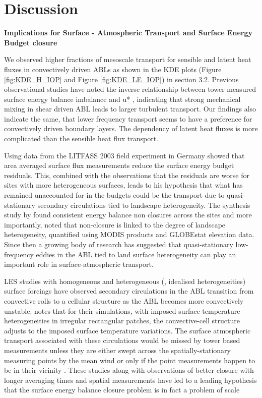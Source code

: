 \documentclass[draft]{agujournal2019}
\begin{document}
\section{Discussion}

\textbf{Implications for Surface - Atmospheric Transport and Surface Energy Budget closure}

We observed higher fractions of  mesoscale transport for sensible and latent heat fluxes in convectively driven ABLs  as shown in the KDE plots (Figure \ref{fig:KDE_H_IOP} and Figure \ref{fig:KDE_LE_IOP}) in section 3.2. Previous observational studies have noted the inverse relationship between tower measured surface energy balance imbalance and u* \cite{stoy_data-driven_2013, eder_mesoscale_2015}, indicating that strong mechanical mixing in shear driven ABL leads to larger turbulent transport. Our findings also indicate the same, that lower frequency transport seems to have a preference for convectively driven boundary layers. The dependency of latent heat fluxes is more complicated than the sensible heat flux transport. 

Using data from the LITFASS 2003 field experiment in Germany   showed that area averaged surface flux measurements reduce the surface energy budget residuals. This, combined with the observations that the residuals are worse for sites with more heterogeneous surfaces, leads to his hypothesis that what has remained unaccounted for in the budgets could be the transport due to quasi-stationary secondary circulations tied to landscape heterogeneity. The synthesis study by  found consistent energy balance non closures across the sites and more importantly, noted that non-closure is linked to the degree of landscape heterogeneity, quantified using MODIS products and GLOBEstat elevation data. Since then a growing body of research has suggested that quasi-stationary low-frequency eddies in the ABL tied to land surface heterogeneity can play an important role in surface-atmospheric transport.

LES studies with homogeneous \cite{salesky_nature_2017, li_coherent_2011} and heterogeneous (, idealised heterogeneities) surface forcings have observed secondary circulations in the ABL transition from convective rolls to a cellular structure as the ABL becomes more convectively unstable.  notes that for their simulations, with imposed surface temperature heterogeneities in irregular rectangular patches, the convective-cell structure adjusts to the imposed surface temperature variations. The surface atmospheric transport associated with these circulations would be missed by tower based measurements unless they are either swept across the spatially-stationary measuring points by the mean wind or only if the point measurements happen to be in their vicinity \cite{mahrt_computing_2010, charuchittipan_extension_2014}.  These studies along with observations of better closure with longer averaging times and spatial measurements have led to a leading hypothesis that the surface energy balance closure problem is in fact a problem of scale \cite{foken_energy_2008, foken_energy_2010, mauder_surface-energy-balance_2020}
\end{document}
